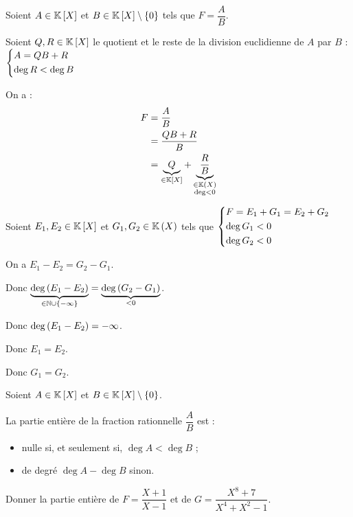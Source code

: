 \begin{dem}
\existence

Soient \(A\in\poly\) et \(B\in\poly\excluant\accol{0}\) tels que \(F=\dfrac{A}{B}\).

Soient \(Q,R\in\poly\) le quotient et le reste de la division euclidienne de \(A\) par \(B\) : \(\begin{dcases}A=QB+R \\ \deg R<\deg B\end{dcases}\)

On a : \[\begin{aligned}
F&=\dfrac{A}{B} \\
&=\dfrac{QB+R}{B} \\
&=\underbrace{Q}_{\in\poly}+\underbrace{\dfrac{R}{B}}_{\substack{\in\fracrat \\ \deg<0}}
\end{aligned}\]

\unicite

Soient \(E_1,E_2\in\poly\) et \(G_1,G_2\in\fracrat\) tels que \(\begin{dcases}F=E_1+G_1=E_2+G_2 \\ \deg G_1<0 \\ \deg G_2<0\end{dcases}\)

On a \(E_1-E_2=G_2-G_1\).

Donc \(\underbrace{\deg\left(E_1-E_2\right)}_{\in\mathbb{N}\cup\left\lbrace-\infty\right\rbrace}=\underbrace{\deg\left(G_2-G_1\right)}_{<0}\).

Donc \(\deg\left(E_1-E_2\right)=-\infty\).

Donc \(E_1=E_2\).

Donc \(G_1=G_2\).
\end{dem}

\begin{rem}
Soient \(A\in\poly\) et \(B\in\poly\excluant\accol{0}\).

La partie entière de la fraction rationnelle \(\dfrac{A}{B}\) est :

\begin{itemize}
\item nulle si, et seulement si, \(\deg A<\deg B\) ; \\

\item de degré \(\deg A-\deg B\) sinon.
\end{itemize}
\end{rem}

\begin{exo}
Donner la partie entière de \(F=\dfrac{X+1}{X-1}\) et de \(G=\dfrac{X^8+7}{X^4+X^2-1}\).
\end{exo}

